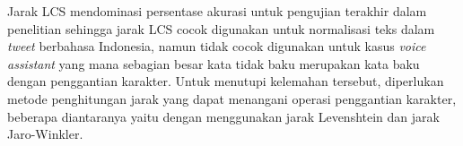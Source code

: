 Jarak LCS mendominasi persentase akurasi untuk pengujian terakhir dalam penelitian \parencite{saragih2017normalisasi} sehingga jarak LCS cocok digunakan untuk normalisasi teks dalam \textit{tweet} berbahasa Indonesia, namun tidak cocok digunakan untuk kasus \textit{voice assistant} yang mana sebagian besar kata tidak baku merupakan kata baku dengan penggantian karakter. Untuk menutupi kelemahan tersebut, diperlukan metode penghitungan jarak yang dapat menangani operasi penggantian karakter, beberapa diantaranya yaitu dengan menggunakan jarak Levenshtein dan jarak Jaro-Winkler.


